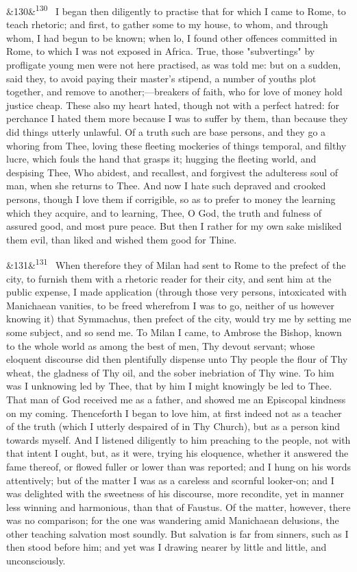 \documentclass[12pt]{article}
\newcommand{\para}[1][]{\par\noindent\ifx&#1&\else\textsuperscript{\footnotesize #1}~\fi}
\begin{document}
\para[130] I began then diligently to practise that for which I came to Rome, to teach rhetoric; and first, to gather some to my house, to whom, and through whom, I had begun to be known; when lo, I found other offences committed in Rome, to which I was not exposed in Africa. True, those "subvertings" by profligate young men were not here practised, as was told me: but on a sudden, said they, to avoid paying their master's stipend, a number of youths plot together, and remove to another;---breakers of faith, who for love of money hold justice cheap. These also my heart hated, though not with a perfect hatred: for perchance I hated them more because I was to suffer by them, than because they did things utterly unlawful. Of a truth such are base persons, and they go a whoring from Thee, loving these fleeting mockeries of things temporal, and filthy lucre, which fouls the hand that grasps it; hugging the fleeting world, and despising Thee, Who abidest, and recallest, and forgivest the adulteress soul of man, when she returns to Thee. And now I hate such depraved and crooked persons, though I love them if corrigible, so as to prefer to money the learning which they acquire, and to learning, Thee, O God, the truth and fulness of assured good, and most pure peace. But then I rather for my own sake misliked them evil, than liked and wished them good for Thine.

\para[131] When therefore they of Milan had sent to Rome to the prefect of the city, to furnish them with a rhetoric reader for their city, and sent him at the public expense, I made application (through those very persons, intoxicated with Manichaean vanities, to be freed wherefrom I was to go, neither of us however knowing it) that Symmachus, then prefect of the city, would try me by setting me some subject, and so send me. To Milan I came, to Ambrose the Bishop, known to the whole world as among the best of men, Thy devout servant; whose eloquent discourse did then plentifully dispense unto Thy people the flour of Thy wheat, the gladness of Thy oil, and the sober inebriation of Thy wine. To him was I unknowing led by Thee, that by him I might knowingly be led to Thee. That man of God received me as a father, and showed me an Episcopal kindness on my coming. Thenceforth I began to love him, at first indeed not as a teacher of the truth (which I utterly despaired of in Thy Church), but as a person kind towards myself. And I listened diligently to him preaching to the people, not with that intent I ought, but, as it were, trying his eloquence, whether it answered the fame thereof, or flowed fuller or lower than was reported; and I hung on his words attentively; but of the matter I was as a careless and scornful looker-on; and I was delighted with the sweetness of his discourse, more recondite, yet in manner less winning and harmonious, than that of Faustus. Of the matter, however, there was no comparison; for the one was wandering amid Manichaean delusions, the other teaching salvation most soundly. But salvation is far from sinners, such as I then stood before him; and yet was I drawing nearer by little and little, and unconsciously.
\end{document}

